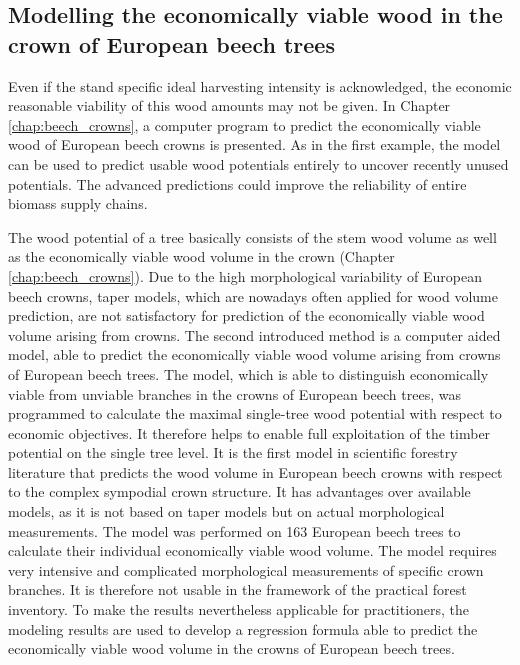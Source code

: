 \subsection{Modelling the economically viable wood in the crown of European beech trees}
\label{subsec:intro:struct:beech_crowns}
Even if the stand specific ideal harvesting intensity is acknowledged, the economic reasonable viability of this wood amounts may not be given. In Chapter \ref{chap:beech_crowns}, a computer program to predict the economically viable wood of European beech crowns is presented. As in the first example, the model can be used to predict usable wood potentials entirely to uncover recently unused potentials. The advanced predictions could improve the reliability of entire biomass supply chains.

The wood potential of a tree basically consists of the stem wood volume as well as the economically viable wood volume in the crown (Chapter \ref{chap:beech_crowns}). Due to the high morphological variability of European beech crowns, taper models, which are nowadays often applied for wood volume prediction, are not satisfactory for prediction of the economically viable wood volume arising from crowns. The second introduced method is a computer aided model, able to predict the economically viable wood volume arising from crowns of European beech trees. The model, which is able to distinguish economically viable from unviable branches in the crowns of European beech trees, was programmed to calculate the maximal single-tree wood potential with respect to economic objectives. It therefore helps to enable full exploitation of the timber potential on the single tree level. It is the first model in scientific forestry literature that predicts the wood volume in European beech crowns with respect to the complex sympodial crown structure. It has advantages over available models, as it is not based on taper models but on actual morphological measurements. The model was performed on 163 European beech trees to calculate their individual economically viable wood volume. The model requires very intensive and complicated morphological measurements of specific crown branches. It is therefore not usable in the framework of the practical forest inventory. To make the results nevertheless applicable for practitioners, the modeling results are used to develop a regression formula able to predict the economically viable wood volume in the crowns of European beech trees. 

